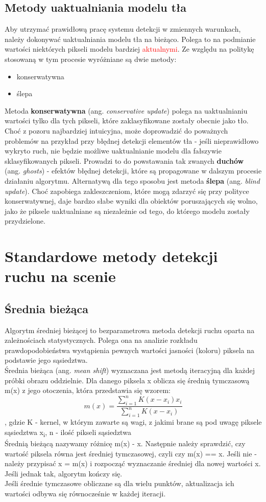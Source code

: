 \subsection{Metody uaktualniania modelu tła}
Aby utrzymać prawidłową pracę systemu detekcji w zmiennych warunkach, należy dokonywać uaktualniania modelu tła na bieżąco. Polega to na podmianie wartości niektórych pikseli modelu bardziej \textcolor{red}{aktualnymi}. Ze względu na politykę stosowaną w tym procesie wyróżniane są dwie metody:
\begin{itemize}
\item konserwatywna
\item ślepa
\end{itemize} 
Metoda \textbf{konserwatywna} (ang. \textit{conservative update}) polega na uaktualnianiu wartości tylko dla tych pikseli, które zaklasyfikowane zostały obecnie jako tło. Choć z pozoru najbardziej intuicyjna, może doprowadzić do poważnych problemów na przykład przy błędnej detekcji elementów tła - jeśli nieprawidłowo wykryto ruch, nie będzie możliwe uaktualnianie modelu dla fałszywie sklasyfikowanych pikseli. Prowadzi to do powstawania tak zwanych \textbf{duchów} (ang. \textit{ghosts}) - efektów błędnej detekcji, które są propagowane w dalszym procesie działaniu algorytmu. Alternatywą dla tego sposobu jest metoda \textbf{ślepa} (ang. \textit{blind update}). Choć zapobiega zakleszczeniom, które mogą zdarzyć się przy polityce konserwatywnej, daje bardzo słabe wyniki dla obiektów poruszających się wolno, jako że piksele uaktualniane są niezależnie od tego, do którego modelu zostały przydzielone.
\section{Standardowe metody detekcji ruchu na scenie}
\subsection{Średnia bieżąca}
Algorytm średniej bieżącej to bezparametrowa metoda detekcji ruchu oparta na zależnościach statystycznych. Polega ona na analizie rozkładu prawdopodobieństwa wystąpienia pewnych wartości jasności (koloru) piksela na podstawie jego sąsiedztwa.\\
\nocite{kheng2011mean}
Średnia bieżąca (ang. \textit{mean shift}) wyznaczana jest metodą iteracyjną dla każdej próbki obrazu oddzielnie. Dla danego piksela x oblicza się średnią tymczasową m(x) z jego otoczenia, która przedstawia się wzorem:
\begin{equation}
m(x) = 
\frac{\sum_{i=1}^{n}K(x-x_{i})x_{i}}{\sum_{i=1}^{n}K(x-x_{i})}
\end{equation}
, gdzie K - kernel, w którym zawarte są wagi, z jakimi brane są pod uwagę piksele sąsiedztwa x\textsubscript{i}, n - ilość pikseli sąsiedztwa \\
Średnią bieżącą nazywamy różnicę m(x) - x.
Następnie należy sprawdzić, czy wartość piksela równa jest średniej tymczasowej, czyli czy m(x) == x. Jeśli nie - należy przypisać x = m(x) i rozpocząć wyznaczanie średniej dla nowej wartości x. Jeśli jednak tak, algorytm kończy się.\\
Jeśli średnie tymczasowe obliczane są dla wielu punktów, aktualizacja ich wartości odbywa się równocześnie w każdej iteracji.
